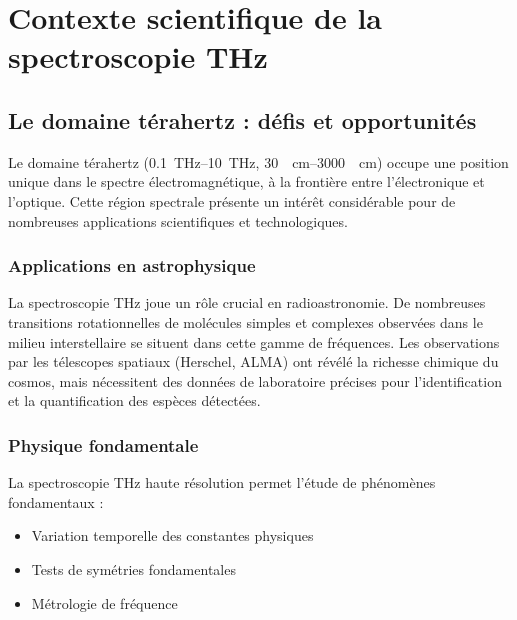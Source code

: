 
\section{Contexte scientifique de la spectroscopie THz}

\subsection{Le domaine térahertz : défis et opportunités}

Le domaine térahertz (\SIrange{0.1}{10}{\THz}, \SIrange{30}{3000}{\per\centi\meter}) occupe une position unique dans le spectre électromagnétique, à la frontière entre l'électronique et l'optique. Cette région spectrale présente un intérêt considérable pour de nombreuses applications scientifiques et technologiques.

\subsubsection{Applications en astrophysique}

La spectroscopie THz joue un rôle crucial en radioastronomie. De nombreuses transitions rotationnelles de molécules simples et complexes observées dans le milieu interstellaire se situent dans cette gamme de fréquences. Les observations par les télescopes spatiaux (Herschel, ALMA) ont révélé la richesse chimique du cosmos, mais nécessitent des données de laboratoire précises pour l'identification et la quantification des espèces détectées.

\subsubsection{Physique fondamentale}

La spectroscopie THz haute résolution permet l'étude de phénomènes fondamentaux :
\begin{itemize}
    \item Variation temporelle des constantes physiques
    \item Tests de symétries fondamentales
    \item Métrologie de fréquence
\end{itemize}

